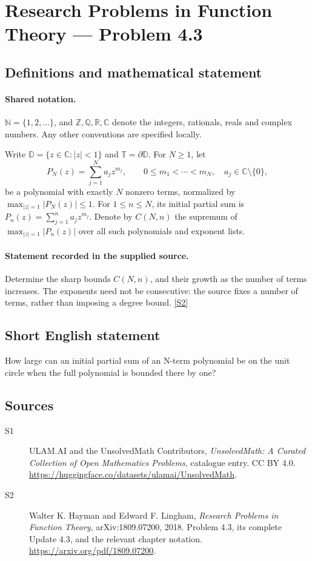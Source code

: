 \documentclass[11pt]{book}
\newcommand{\sref}[2]{\hyperlink{source:#1:#2}{[S#2]}}
\begin{document}
\section{Research Problems in Function Theory — Problem 4.3}\label{statement}

\subsection{Definitions and mathematical statement}

\paragraph{Shared notation.}$\mathbb N=\{1,2,\ldots\}$, and $\mathbb Z,\mathbb Q,\mathbb R,\mathbb C$ denote the integers, rationals, reals and complex numbers. Any other conventions are specified locally.


Write $\mathbb D=\{z\in\mathbb C:|z|<1\}$ and $\mathbb T=\partial\mathbb D$. For $N\ge1$, let
\[P_N(z)=\sum_{j=1}^Na_jz^{m_j},\qquad 0\le m_1<\cdots<m_N,\quad a_j\in\mathbb C\setminus\{0\},
\]
be a polynomial with exactly $N$ nonzero terms, normalized by $\max_{|z|=1}|P_N(z)|\le1$. For $1\le n\le N$, its initial partial sum is $P_n(z)=\sum_{j=1}^na_jz^{m_j}$. Denote by $C(N,n)$ the supremum of $\max_{|z|=1}|P_n(z)|$ over all such polynomials and exponent lists.
\paragraph{Statement recorded in the supplied source.}
Determine the sharp bounds $C(N,n)$, and their growth as the number of terms increases. The exponents need not be consecutive: the source fixes a number of terms, rather than imposing a degree bound. \sref{statement}{2}
\subsection{Short English statement}
How large can an initial partial sum of an N-term polynomial be on the unit circle when the full polynomial is bounded there by one?
\subsection{Sources}
\begin{description}
\item[\hypertarget{source:statement:1}{S1}] ULAM.AI and the UnsolvedMath Contributors, \emph{UnsolvedMath: A Curated Collection of Open Mathematics Problems}, catalogue entry. CC BY 4.0. \url{https://huggingface.co/datasets/ulamai/UnsolvedMath}.
\item[\hypertarget{source:statement:2}{S2}] Walter K. Hayman and Edward F. Lingham, \emph{Research Problems in Function Theory}, arXiv:1809.07200, 2018. Problem 4.3, its complete Update 4.3, and the relevant chapter notation. \url{https://arxiv.org/pdf/1809.07200}.
\end{description}
\label{end:statement}
\end{document}
